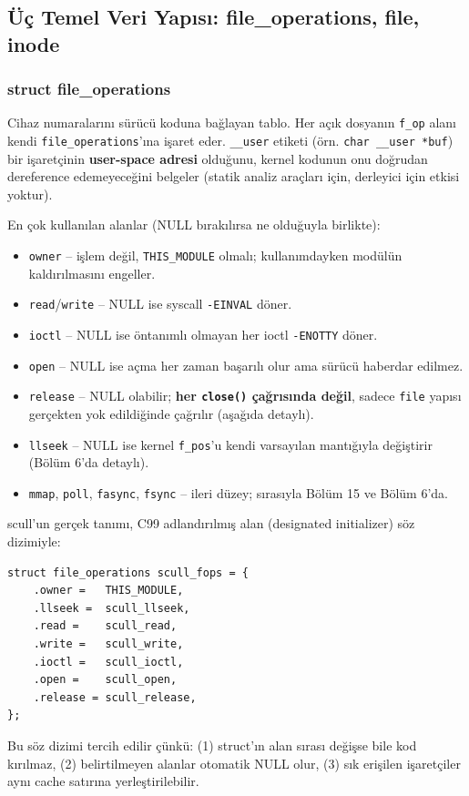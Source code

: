 \documentclass[11pt,a4paper]{article}
\begin{document}
\subsection{\"U\c{c} Temel Veri Yap\i s\i: file\_operations, file, inode}

\subsubsection{struct file\_operations}

Cihaz numaralarını sürücü koduna bağlayan tablo. Her açık dosyanın
\texttt{f\_op} alanı kendi \texttt{file\_operations}'ına işaret eder.
\texttt{\_\_user} etiketi (örn. \texttt{char \_\_user *buf}) bir
işaretçinin \textbf{user-space adresi} olduğunu, kernel kodunun onu
doğrudan dereference edemeyeceğini belgeler (statik analiz araçları
için, derleyici için etkisi yoktur).

En çok kullanılan alanlar (NULL bırakılırsa ne olduğuyla birlikte):

\begin{itemize}[leftmargin=1.2cm]
  \item \texttt{owner} -- işlem değil, \texttt{THIS\_MODULE} olmalı;
  kullanımdayken modülün kaldırılmasını engeller.
  \item \texttt{read}/\texttt{write} -- NULL ise syscall
  \texttt{-EINVAL} döner.
  \item \texttt{ioctl} -- NULL ise öntanımlı olmayan her ioctl
  \texttt{-ENOTTY} döner.
  \item \texttt{open} -- NULL ise açma her zaman başarılı olur ama
  sürücü haberdar edilmez.
  \item \texttt{release} -- NULL olabilir; \textbf{her \texttt{close()}
  çağrısında değil}, sadece \texttt{file} yapısı gerçekten yok
  edildiğinde çağrılır (aşağıda detaylı).
  \item \texttt{llseek} -- NULL ise kernel \texttt{f\_pos}'u kendi
  varsayılan mantığıyla değiştirir (Bölüm 6'da detaylı).
  \item \texttt{mmap}, \texttt{poll}, \texttt{fasync}, \texttt{fsync}
  -- ileri düzey; sırasıyla Bölüm 15 ve Bölüm 6'da.
\end{itemize}

scull'un gerçek tanımı, C99 adlandırılmış alan (designated initializer)
söz dizimiyle:
\begin{lstlisting}
struct file_operations scull_fops = {
    .owner =   THIS_MODULE,
    .llseek =  scull_llseek,
    .read =    scull_read,
    .write =   scull_write,
    .ioctl =   scull_ioctl,
    .open =    scull_open,
    .release = scull_release,
};
\end{lstlisting}
Bu söz dizimi tercih edilir çünkü: (1) struct'ın alan sırası değişse
bile kod kırılmaz, (2) belirtilmeyen alanlar otomatik NULL olur, (3)
sık erişilen işaretçiler aynı cache satırına yerleştirilebilir.
\end{document}

